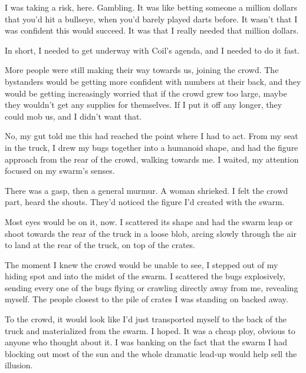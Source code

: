 I was taking a risk, here.  Gambling.  It was like betting someone a million dollars that you'd hit a bullseye, when you'd barely played darts before.  It wasn't that I was confident this would succeed.  It was that I really needed that million dollars.



In short, I needed to get underway with Coil's agenda, and I needed to do it fast.



More people were still making their way towards us, joining the crowd.  The bystanders would be getting more confident with numbers at their back, and they would be getting increasingly worried that if the crowd grew too large, maybe they wouldn't get any supplies for themselves.  If I put it off any longer, they could mob us, and I didn't want that.



No, my gut told me this had reached the point where I had to act.  From my seat in the truck, I drew my bugs together into a humanoid shape, and had the figure approach from the rear of the crowd, walking towards me.  I waited, my attention focused on my swarm's senses.



There was a gasp, then a general murmur.  A woman shrieked.  I felt the crowd part, heard the shouts.  They'd noticed the figure I'd created with the swarm.



Most eyes would be on it, now.  I scattered its shape and had the swarm leap or shoot towards the rear of the truck in a loose blob, arcing slowly through the air to land at the rear of the truck, on top of the crates.



The moment I knew the crowd would be unable to see, I stepped out of my hiding spot and into the midst of the swarm.  I scattered the bugs explosively, sending every one of the bugs flying or crawling directly away from me, revealing myself.  The people closest to the pile of crates I was standing on backed away.



To the crowd, it would look like I'd just transported myself to the back of the truck and materialized from the swarm.  I hoped.  It was a cheap ploy, obvious to anyone who thought about it.  I was banking on the fact that the swarm I had blocking out most of the sun and the whole dramatic lead-up would help sell the illusion.



